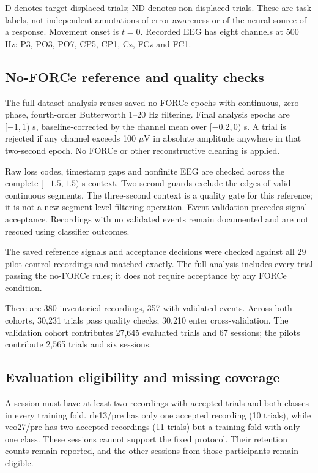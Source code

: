 \documentclass[11pt,a4paper]{article}
\newcommand{\uv}{\ensuremath{\mu\mathrm{V}}}
\begin{document}
D denotes target-displaced trials; ND denotes non-displaced trials. These are task labels, not independent annotations of error awareness or of the neural source of a response. Movement onset is $t=0$. Recorded EEG has eight channels at 500 Hz: P3, PO3, PO7, CP5, CP1, Cz, FCz and FC1.

\subsection{No-FORCe reference and quality checks}
The full-dataset analysis reuses saved no-FORCe epochs with continuous, zero-phase, fourth-order Butterworth 1--20 Hz filtering. Final analysis epochs are $[-1,1)$ s, baseline-corrected by the channel mean over $[-0.2,0)$ s. A trial is rejected if any channel exceeds 100 \uv{} in absolute amplitude anywhere in that two-second epoch. No FORCe or other reconstructive cleaning is applied.

Raw loss codes, timestamp gaps and nonfinite EEG are checked across the complete $[-1.5,1.5)$ s context. Two-second guards exclude the edges of valid continuous segments. The three-second context is a quality gate for this reference; it is not a new segment-level filtering operation. Event validation precedes signal acceptance. Recordings with no validated events remain documented and are not rescued using classifier outcomes.

The saved reference signals and acceptance decisions were checked against all 29 pilot control recordings and matched exactly. The full analysis includes every trial passing the no-FORCe rules; it does not require acceptance by any FORCe condition.

\begin{table}[H]\centering\small\setlength{\tabcolsep}{3.4pt}

\caption{Trial inclusion by cohort. $N$ is participants; Event-valid is before signal-quality exclusion; Accepted is after the no-FORCe quality rules; Evaluated additionally requires an evaluable recording-wise split. ND and D counts refer to evaluated trials. Sessions are participant/session combinations.}\label{tab:retention}
\end{table}
There are 380 inventoried recordings, 357 with validated events. Across both cohorts, 30,231 trials pass quality checks; 30,210 enter cross-validation. The validation cohort contributes 27,645 evaluated trials and 67 sessions; the pilots contribute 2,565 trials and six sessions.

\subsection{Evaluation eligibility and missing coverage}
A session must have at least two recordings with accepted trials and both classes in every training fold. rle13/pre has only one accepted recording (10 trials), while vco27/pre has two accepted recordings (11 trials) but a training fold with only one class. These sessions cannot support the fixed protocol. Their retention counts remain reported, and the other sessions from those participants remain eligible.
\end{document}
